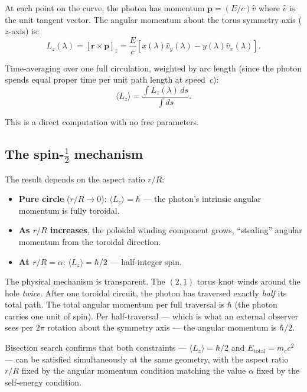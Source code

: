 \documentclass[11pt,a4paper]{article}
\begin{document}
At each point on the curve, the photon has momentum $\mathbf{p} = (E/c)\hat{v}$ where $\hat{v}$ is the unit tangent vector. The angular momentum about the torus symmetry axis ($z$-axis) is:
\begin{equation}
  L_z(\lambda) = [\mathbf{r} \times \mathbf{p}]_z = \frac{E}{c}\left[x(\lambda)\hat{v}_y(\lambda) - y(\lambda)\hat{v}_x(\lambda)\right].
  \label{eq:Lz}
\end{equation}

Time-averaging over one full circulation, weighted by arc length (since the photon spends equal proper time per unit path length at speed~$c$):
\begin{equation}
  \langle L_z \rangle = \frac{\int L_z(\lambda)\, ds}{\int ds}.
  \label{eq:Lz-avg}
\end{equation}

This is a direct computation with no free parameters.

\subsection{The spin-\texorpdfstring{$\frac{1}{2}$}{1/2} mechanism}

The result depends on the aspect ratio $r/R$:
\begin{itemize}
  \item \textbf{Pure circle} ($r/R \to 0$): $\langle L_z \rangle = \hbar$ --- the photon's intrinsic angular momentum is fully toroidal.
  \item \textbf{As $r/R$ increases}, the poloidal winding component grows, ``stealing'' angular momentum from the toroidal direction.
  \item \textbf{At $r/R = \alpha$}: $\langle L_z \rangle = \hbar/2$ --- half-integer spin.
\end{itemize}

The physical mechanism is transparent. The $(2,1)$ torus knot winds around the hole \emph{twice}. After one toroidal circuit, the photon has traversed exactly \emph{half} its total path. The total angular momentum per full traversal is $\hbar$ (the photon carries one unit of spin). Per half-traversal --- which is what an external observer sees per $2\pi$ rotation about the symmetry axis --- the angular momentum is $\hbar/2$.

Bisection search confirms that both constraints --- $\langle L_z \rangle = \hbar/2$ and $E_{\text{total}} = m_e c^2$ --- can be satisfied simultaneously at the same geometry, with the aspect ratio $r/R$ fixed by the angular momentum condition matching the value $\alpha$ fixed by the self-energy condition.
\end{document}
